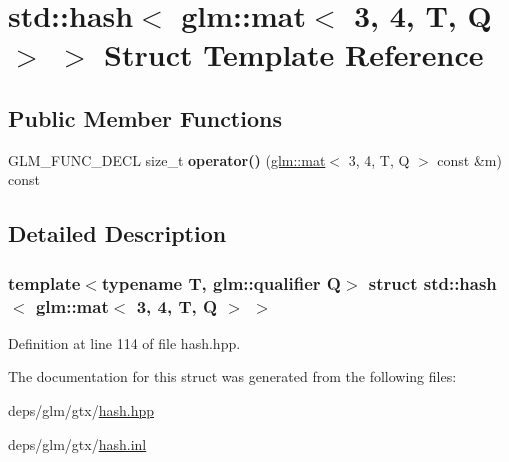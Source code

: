 \hypertarget{structstd_1_1hash_3_01glm_1_1mat_3_013_00_014_00_01T_00_01Q_01_4_01_4}{}\section{std\+:\+:hash$<$ glm\+:\+:mat$<$ 3, 4, T, Q $>$ $>$ Struct Template Reference}
\label{structstd_1_1hash_3_01glm_1_1mat_3_013_00_014_00_01T_00_01Q_01_4_01_4}
\subsection*{Public Member Functions}
\begin{DoxyCompactItemize}
\item 
\mbox{\label{structstd_1_1hash_3_01glm_1_1mat_3_013_00_014_00_01T_00_01Q_01_4_01_4_ac969a1d89f7682683acf2fcbc1575fd5}} 
G\+L\+M\+\_\+\+F\+U\+N\+C\+\_\+\+D\+E\+CL size\+\_\+t {\bfseries operator()} (\hyperlink{structglm_1_1mat}{glm\+::mat}$<$ 3, 4, T, Q $>$ const \&m) const
\end{DoxyCompactItemize}


\subsection{Detailed Description}
\subsubsection*{template$<$typename T, glm\+::qualifier Q$>$\newline
struct std\+::hash$<$ glm\+::mat$<$ 3, 4, T, Q $>$ $>$}



Definition at line 114 of file hash.\+hpp.



The documentation for this struct was generated from the following files\+:\begin{DoxyCompactItemize}
\item 
deps/glm/gtx/\hyperlink{hash_8hpp}{hash.\+hpp}\item 
deps/glm/gtx/\hyperlink{hash_8inl}{hash.\+inl}\end{DoxyCompactItemize}
